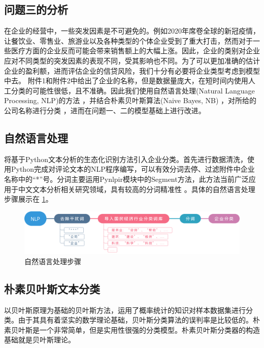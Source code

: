 \documentclass[withoutpreface,bwprint]{cumcmthesis} %
\begin{document}
\subsection{问题三的分析}
在企业的经营中，一些突发因素是不可避免的。例如2020年席卷全球的新冠疫情，让餐饮业、零售业、旅游业以及各种类型的个体企业受到了重大打击，然而对于一些医疗方面的企业反而可能会带来销售额上的大幅上涨。因此，企业的类别对企业应对不同类型的突发因素的表现不同，受其影响也不同。为了可以更加准确的估计企业的盈利额，进而评估企业的信贷风险，我们十分有必要将企业类型考虑到模型中去。
附件1和附件2中给出了企业的名称，但是数据量庞大，在短时间内使用人工分类的可能性很低，且不准确。因此我们使用自然语言处理(Natural Language Processing, NLP)的方法 \cite{陈肇雄1989自然语言处理,张钹2007自然语言处理的计算模型,李舟军2020面向自然语言处理的预训练技术研究综述}，并结合朴素贝叶斯算法(Naive Bayes, NB) \cite{林江豪2012一种基于朴素贝叶斯的微博情感分类}，对所给的公司名称进行分类 \cite{王垚尧0基于机器学习的经济行业分类方法研究}，进而在问题一、二的模型基础上进行改进。



\subsection{自然语言处理}
将基于Python文本分析的生态化识别方法引入企业分类。首先进行数据清洗，使用Python完成对评论文本的NLP程序编写，可以有效分词去停、过滤附件中企业名称中的“*”号。分词主要运用Pynlpir模块中的Segment方法，此方法当前广泛应用于中文文本分析相关研究领域，具有较高的分词精准性 \cite{李筱瑜2019基于新词发现与词典信息的古籍文本分词研究,2019Study}。具体的自然语言处理步骤展示在 \ref{fig:NLP}。

\begin{figure}[h]
	\centering
	\includegraphics[width=\textwidth]{fig/NLP.png}
	\caption{自然语言处理步骤}
	\label{fig:NLP}
\end{figure}



\subsection{朴素贝叶斯文本分类}
以贝叶斯原理为基础的贝叶斯方法，运用了概率统计的知识对样本数据集进行分类。由于其具有着坚实的数学理论基础，贝叶斯分类算法的误判率是比较低的。朴素贝叶斯是一个非常简单，但是实用性很强的分类模型。朴素贝叶斯分类器的构造基础就是贝叶斯理论。
\end{document}
